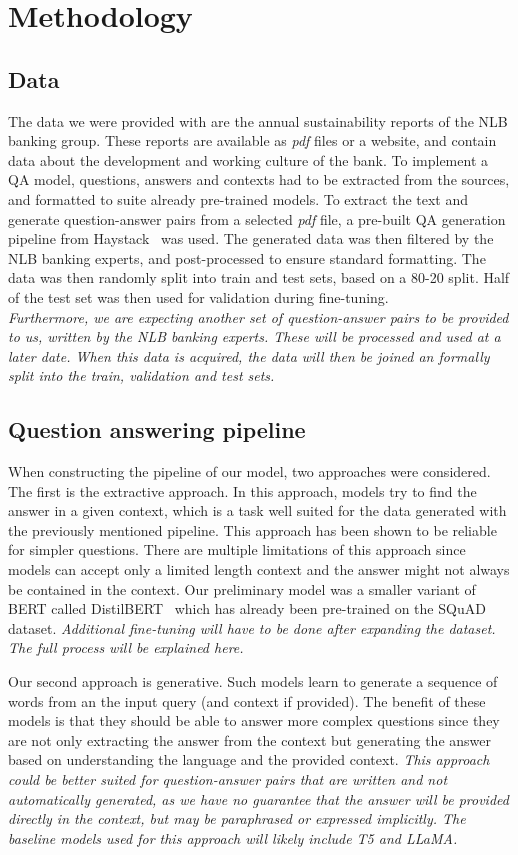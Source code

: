 \documentclass[fleqn,moreauthors,10pt]{ds_report}
\begin{document}
\section*{Methodology}
\subsection*{Data}
The data we were provided with are the annual sustainability reports of the NLB banking group.
These reports are available as \textit{pdf} files or a website, and contain data about the development and working culture of the bank.
To implement a QA model, questions, answers and contexts had to be extracted from the sources, and formatted to suite already pre-trained models.
To extract the text and generate question-answer pairs from a selected \textit{pdf} file, a pre-built QA generation pipeline from Haystack~\cite{haystack} was used.
The generated data was then filtered by the NLB banking experts, and post-processed to ensure standard formatting.
The data was then randomly split into train and test sets, based on a 80-20 split. Half of the test set was then used for validation during fine-tuning.\\
{\it Furthermore, we are expecting another set of question-answer pairs to be provided to us, written by the NLB banking experts. These will be processed and used at a later date. When this data is acquired, the data will then be joined an formally split into the train, validation and test sets.}

\subsection*{Question answering pipeline}
When constructing the pipeline of our model, two approaches were considered.
The first is the extractive approach.
In this approach, models try to find the answer in a given context, which is a task well suited for the data generated with the previously mentioned pipeline.
This approach has been shown to be reliable for simpler questions.
There are multiple limitations of this approach since models can accept only a limited length context and the answer might not always be contained in the context.
Our preliminary model was a smaller variant of BERT called DistilBERT~\cite{sanh2019distilbert} which has already been pre-trained on the SQuAD dataset.
{\it Additional fine-tuning will have to be done after expanding the dataset. The full process will be explained here.}

Our second approach is generative.
Such models learn to generate a sequence of words from an the input query (and context if provided).
The benefit of these models is that they should be able to answer more complex questions since they are not only extracting the answer from the context but generating the answer based on understanding the language and the provided context.
{\it This approach could be better suited for question-answer pairs that are written and not automatically generated, as we have no guarantee that the answer will be provided directly in the context, but may be paraphrased or expressed implicitly. The baseline models used for this approach will likely include T5 and LLaMA.}
\end{document}
